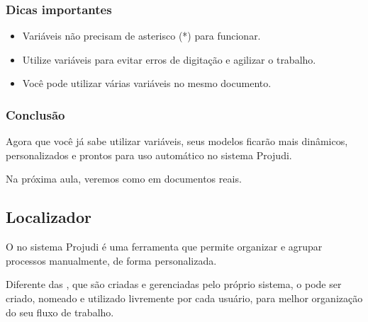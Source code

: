 \documentclass[letterpaper,10pt,brazil]{sphinxmanual}
\begin{document}
\subsubsection{Dicas importantes}
\label{\detokenize{projud_49_variaveis:dicas-importantes}}\begin{itemize}
\item {} 
\sphinxAtStartPar
Variáveis não precisam de asterisco (*) para funcionar.

\item {} 
\sphinxAtStartPar
Utilize variáveis para evitar erros de digitação e agilizar o trabalho.

\item {} 
\sphinxAtStartPar
Você pode utilizar várias variáveis no mesmo documento.

\end{itemize}


\subsubsection{Conclusão}
\label{\detokenize{projud_49_variaveis:conclusao}}
\sphinxAtStartPar
Agora que você já sabe utilizar variáveis, seus modelos ficarão mais dinâmicos, personalizados e prontos para uso automático no sistema Projudi.

\sphinxAtStartPar
Na próxima aula, veremos como  em documentos reais.

\sphinxstepscope


\subsection{Localizador}
\label{\detokenize{projud_50_localizador:localizador}}\label{\detokenize{projud_50_localizador::doc}}
\sphinxAtStartPar
O  no sistema Projudi é uma ferramenta que permite organizar e agrupar processos manualmente, de forma personalizada.

\sphinxAtStartPar
Diferente das , que são criadas e gerenciadas pelo próprio sistema, o  pode ser criado, nomeado e utilizado livremente por cada usuário, para melhor organização do seu fluxo de trabalho.
\end{document}
